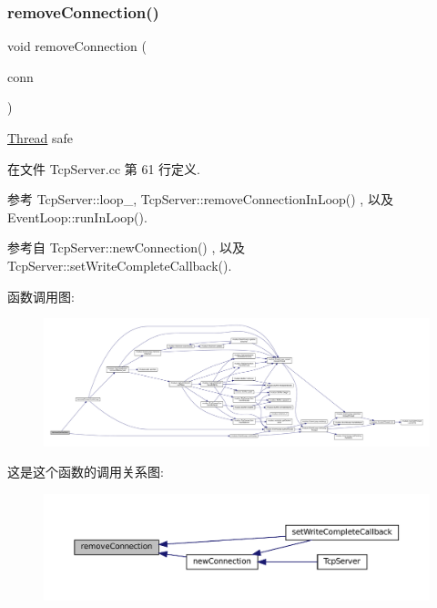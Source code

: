 \subsubsection{\texorpdfstring{remove\+Connection()}{removeConnection()}}
{\footnotesize\ttfamily void remove\+Connection (\begin{DoxyParamCaption}\item[{const \hyperlink{namespacemuduo_a40c45128e9700d337d92f3cbb8dd4a0a}{Tcp\+Connection\+Ptr} \&}]{conn }\end{DoxyParamCaption})\hspace{0.3cm}{\ttfamily [private]}}



\hyperlink{classmuduo_1_1Thread}{Thread} safe 



在文件 Tcp\+Server.\+cc 第 61 行定义.



参考 Tcp\+Server\+::loop\+\_\+, Tcp\+Server\+::remove\+Connection\+In\+Loop() , 以及 Event\+Loop\+::run\+In\+Loop().



参考自 Tcp\+Server\+::new\+Connection() , 以及 Tcp\+Server\+::set\+Write\+Complete\+Callback().

函数调用图\+:
\nopagebreak
\begin{figure}[H]
\begin{center}
\leavevmode
\includegraphics[width=350pt]{classmuduo_1_1TcpServer_ad9661c3f05443256c9439f812d1a7691_cgraph}
\end{center}
\end{figure}
这是这个函数的调用关系图\+:
\nopagebreak
\begin{figure}[H]
\begin{center}
\leavevmode
\includegraphics[width=350pt]{classmuduo_1_1TcpServer_ad9661c3f05443256c9439f812d1a7691_icgraph}
\end{center}
\end{figure}
\mbox{\label{classmuduo_1_1TcpServer_a38345725075c2bf845af025c2567d977}} 
